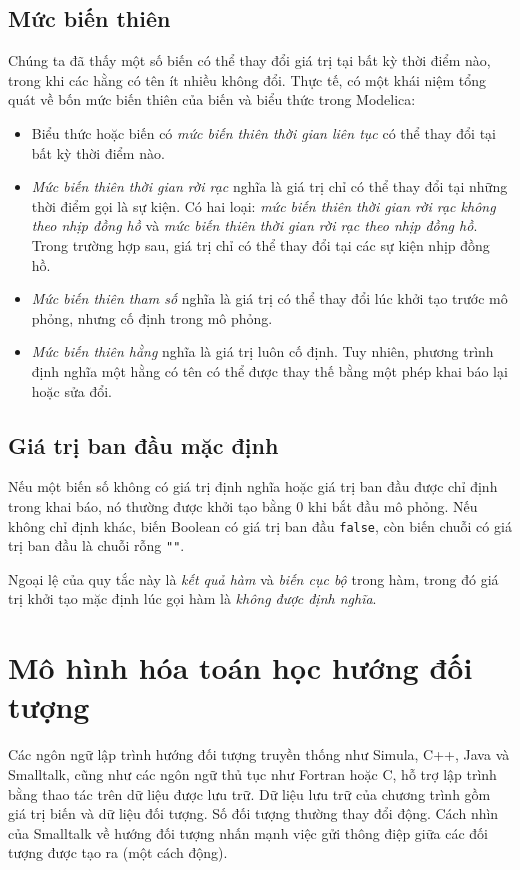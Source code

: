 \subsection{Mức biến thiên}
Chúng ta đã thấy một số biến có thể thay đổi giá trị tại bất kỳ thời điểm nào, trong khi các hằng có tên ít nhiều không đổi. Thực tế, có một khái niệm tổng quát về bốn mức biến thiên của biến và biểu thức trong Modelica:
\begin{itemize}
\item Biểu thức hoặc biến có \emph{mức biến thiên thời gian liên tục} có thể thay đổi tại bất kỳ thời điểm nào.
\item \emph{Mức biến thiên thời gian rời rạc} nghĩa là giá trị chỉ có thể thay đổi tại những thời điểm gọi là sự kiện. Có hai loại: \emph{mức biến thiên thời gian rời rạc không theo nhịp đồng hồ} và \emph{mức biến thiên thời gian rời rạc theo nhịp đồng hồ}. Trong trường hợp sau, giá trị chỉ có thể thay đổi tại các sự kiện nhịp đồng hồ.
\item \emph{Mức biến thiên tham số} nghĩa là giá trị có thể thay đổi lúc khởi tạo trước mô phỏng, nhưng cố định trong mô phỏng.
\item \emph{Mức biến thiên hằng} nghĩa là giá trị luôn cố định. Tuy nhiên, phương trình định nghĩa một hằng có tên có thể được thay thế bằng một phép khai báo lại hoặc sửa đổi.
\end{itemize}

\subsection{Giá trị ban đầu mặc định}
Nếu một biến số không có giá trị định nghĩa hoặc giá trị ban đầu được chỉ định trong khai báo, nó thường được khởi tạo bằng 0 khi bắt đầu mô phỏng. Nếu không chỉ định khác, biến Boolean có giá trị ban đầu \texttt{false}, còn biến chuỗi có giá trị ban đầu là chuỗi rỗng \texttt{""}.

Ngoại lệ của quy tắc này là \emph{kết quả hàm} và \emph{biến cục bộ} trong hàm, trong đó giá trị khởi tạo mặc định lúc gọi hàm là \emph{không được định nghĩa}.

\section{Mô hình hóa toán học hướng đối tượng}
Các ngôn ngữ lập trình hướng đối tượng truyền thống như Simula, C++, Java và Smalltalk, cũng như các ngôn ngữ thủ tục như Fortran hoặc C, hỗ trợ lập trình bằng thao tác trên dữ liệu được lưu trữ. Dữ liệu lưu trữ của chương trình gồm giá trị biến và dữ liệu đối tượng. Số đối tượng thường thay đổi động. Cách nhìn của Smalltalk về hướng đối tượng nhấn mạnh việc gửi thông điệp giữa các đối tượng được tạo ra (một cách động).

